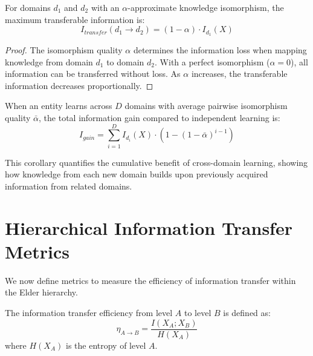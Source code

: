 \begin{theorem}
For domains $d_1$ and $d_2$ with an $\alpha$-approximate knowledge isomorphism, the maximum transferable information is:
\begin{equation}
I_{transfer}(d_1 \to d_2) = (1 - \alpha) \cdot I_{d_1}(X)
\end{equation}
\end{theorem}

\begin{proof}
The isomorphism quality $\alpha$ determines the information loss when mapping knowledge from domain $d_1$ to domain $d_2$. With a perfect isomorphism ($\alpha = 0$), all information can be transferred without loss. As $\alpha$ increases, the transferable information decreases proportionally.
\end{proof}

\begin{corollary}
When an entity learns across $D$ domains with average pairwise isomorphism quality $\bar{\alpha}$, the total information gain compared to independent learning is:
\begin{equation}
I_{gain} = \sum_{i=1}^{D} I_{d_i}(X) \cdot (1 - (1 - \bar{\alpha})^{i-1})
\end{equation}
\end{corollary}

This corollary quantifies the cumulative benefit of cross-domain learning, showing how knowledge from each new domain builds upon previously acquired information from related domains.

\section{Hierarchical Information Transfer Metrics}



We now define metrics to measure the efficiency of information transfer within the Elder hierarchy.

\begin{definition}
The information transfer efficiency from level $A$ to level $B$ is defined as:
\begin{equation}
\eta_{A \to B} = \frac{I(X_A; X_B)}{H(X_A)}
\end{equation}
where $H(X_A)$ is the entropy of level $A$.
\end{definition}

